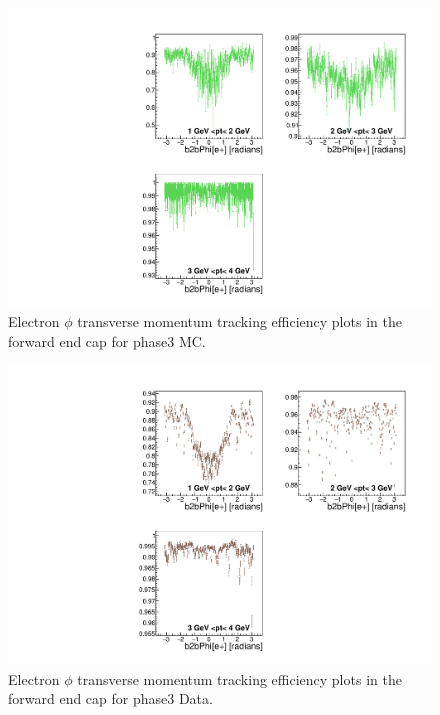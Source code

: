 \documentclass[a4paper,11pt,twosided,final,german,openbib,pdftex,listof=totoc,bibliography=totoc]{scrbook}
\begin{document}
\begin{appendix}
\begin{figure}[!htbp]
	\centering
	\includegraphics[width=\textwidth]{Plots/master3/xPtMPhiemFC_MCP3}
	\caption[Transverse Momentum $\phi$ Electron Forward End Cap Efficiency Phase3 MC]{Electron $\phi$ transverse momentum tracking efficiency plots in the forward end cap for phase3 MC.}
	\label{plt:PtMPhiemFC3_MC}
\end{figure}


\begin{figure}[!htbp]
	\centering
	\includegraphics[width=\textwidth]{Plots/master3/xPtMPhiemFC_DataP3}
	\caption[Transverse Momentum $\phi$ Electron Forward End Cap Efficiency Phase3 Data]{Electron $\phi$ transverse momentum tracking efficiency plots in the forward end cap for phase3 Data.}
	\label{plt:PtMPhiemFC3_Data}
\end{figure}








\end{appendix}
\end{document}

